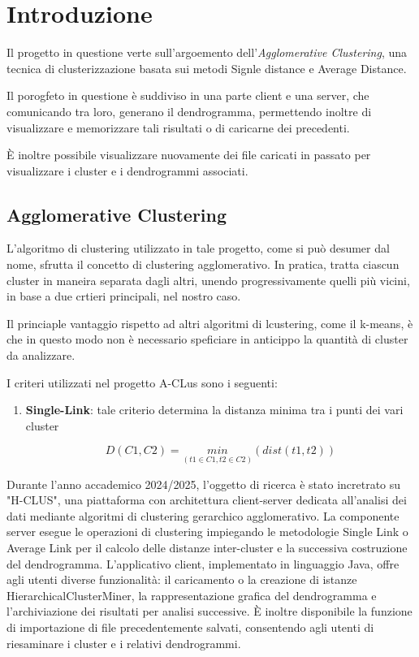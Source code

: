 \section{Introduzione}

Il progetto in questione verte sull'argoemento dell'\textit{Agglomerative Clustering}, una tecnica di clusterizzazione basata sui metodi Signle distance e Average Distance. 

Il porogfeto in questione è suddiviso in una parte client e una server, che comunicando tra loro, generano il dendrogramma, permettendo inoltre di visualizzare e memorizzare tali risultati o di caricarne dei precedenti.

È inoltre possibile visualizzare nuovamente dei file caricati in passato per visualizzare i cluster e i dendrogrammi associati. 


\subsection{Agglomerative Clustering}

L'algoritmo di clustering utilizzato in tale progetto, come si può desumer dal nome, sfrutta il concetto di clustering agglomerativo. In pratica, tratta ciascun cluster in maneira separata dagli altri, unendo progressivamente quelli più vicini, in base a due crtieri principali, nel nostro caso.

Il princiaple vantaggio  rispetto ad altri algoritmi di lcustering, come il k-means, è che in questo modo non è necessario speficiare in anticippo la quantità di cluster da analizzare. 

I criteri utilizzati nel progetto A-CLus sono i seguenti: 

\begin{enumerate}
    \item \textbf{Single-Link}: tale criterio determina la distanza minima tra i punti dei vari cluster

    \begin{equation}
        D\left(C1,C2\right) = \underset{\left(t1 \in C1,t2 \in C2\right)}{min}\left( dist\left(t1,t2\right)\right)
    \end{equation}
\end{enumerate}


Durante l'anno accademico 2024/2025, l'oggetto di ricerca è stato incretrato su "H-CLUS", una piattaforma con architettura client-server dedicata all'analisi dei dati mediante algoritmi di clustering gerarchico agglomerativo. La componente server esegue le operazioni di clustering impiegando le metodologie Single Link o Average Link per il calcolo delle distanze inter-cluster e la successiva costruzione del dendrogramma. L'applicativo client, implementato in linguaggio Java, offre agli utenti diverse funzionalità: il caricamento o la creazione di istanze HierarchicalClusterMiner, la rappresentazione grafica del dendrogramma e l'archiviazione dei risultati per analisi successive. È inoltre disponibile la funzione di importazione di file precedentemente salvati, consentendo agli utenti di riesaminare i cluster e i relativi dendrogrammi. 

